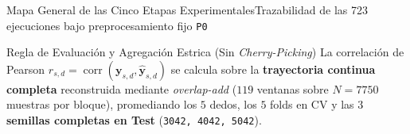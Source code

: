 
\begin{frame}{Mapa General de las Cinco Etapas Experimentales}{Trazabilidad de las 723 ejecuciones bajo preprocesamiento fijo \texttt{P0} \cite{rodas_valencia_tpe_ecog}}
  \scriptsize
  \begin{block}{Regla de Evaluaci\'on y Agregaci\'on Estrica (Sin \textit{Cherry-Picking})}
    La correlaci\'on de Pearson $r_{s,d} = \operatorname{corr}(\mathbf{y}_{s,d}, \hat{\mathbf{y}}_{s,d})$ se calcula sobre la \textbf{trayectoria continua completa} reconstruida mediante \textit{overlap-add} ($119$ ventanas sobre $N=7750$ muestras por bloque), promediando los $5$ dedos, los $5$ folds en CV y las \textbf{$3$ semillas completas en Test} (\texttt{3042, 4042, 5042}).
  \end{block}


\end{frame}
